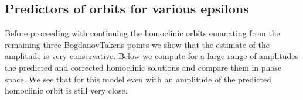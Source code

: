 \documentclass[letterpaper,10pt,english]{jupyterBook}
\begin{document}
\noindent{}


\subsection{Predictors of orbits for various epsilons}
\label{\detokenize{Morris-Lecar:predictors-of-orbits-for-various-epsilons}}
\sphinxAtStartPar
Before proceeding with continuing the homoclinic orbits emanating from the
remaining three Bogdanov\sphinxhyphen{}Takens points we show that the estimate of the
amplitude is very conservative. Below we compute for a large range of
amplitudes the predicted and corrected homoclinic solutions and compare them in
phase space. We see that for this model even with an amplitude of  the
predicted homoclinic orbit is still very close.
\end{document}
